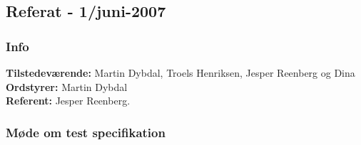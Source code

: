 \subsection{Referat - 1/juni-2007}

\subsubsection{Info}

\textbf{Tilstedeværende:} Martin Dybdal, Troels Henriksen, Jesper Reenberg og Dina\\
\textbf{Ordstyrer:} Martin Dybdal\\
\textbf{Referent:} Jesper Reenberg.

\subsubsection{Møde om test specifikation}

